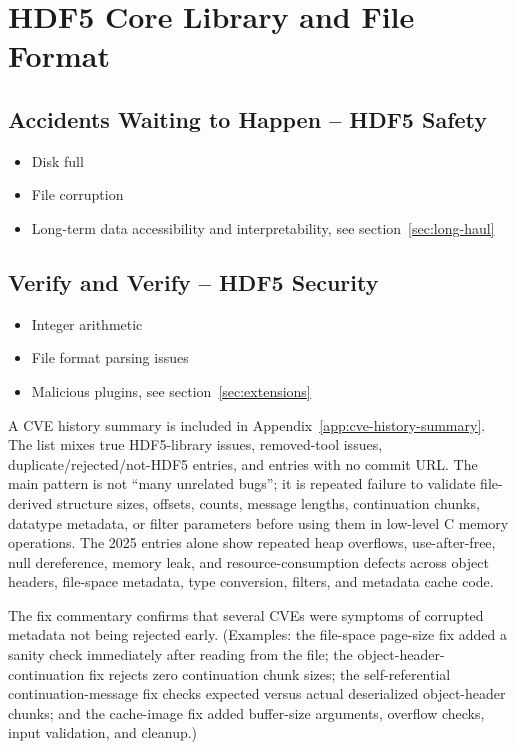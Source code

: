 \documentclass[../main.tex]{subfiles}
\begin{document}
\section{HDF5 Core Library and File Format}
\label{sec:core-lib-format}

\subsection{Accidents Waiting to Happen -- HDF5 Safety}

\begin{itemize}
    \item Disk full~\cite{forum-11714}
    \item File corruption~\cite{forum-file-corruption}
    \item Long-term data accessibility and interpretability, see section~\ref{sec:long-haul}
\end{itemize}

\subsection{Verify and Verify -- HDF5 Security}

\begin{itemize}
    \item Integer arithmetic
    \item File format parsing issues
    \item Malicious plugins, see section~\ref{sec:extensions}
\end{itemize}

A CVE history summary is included in Appendix~\ref{app:cve-history-summary}.
The list mixes true HDF5-library issues, removed-tool issues,
duplicate/rejected/not-HDF5 entries, and entries with no commit URL.
The main pattern is not “many unrelated bugs”; it is repeated failure to validate
file-derived structure sizes, offsets, counts, message lengths, continuation chunks,
datatype metadata, or filter parameters before using them in low-level C memory
operations. The 2025 entries alone show repeated heap overflows, use-after-free,
null dereference, memory leak, and resource-consumption defects across object
headers, file-space metadata, type conversion, filters, and metadata cache code.

The fix commentary confirms that several CVEs were symptoms of corrupted metadata
not being rejected early. (Examples: the file-space page-size fix added a sanity
check immediately after reading  from the file; the
object-header-continuation fix rejects zero continuation chunk sizes;
the self-referential continuation-message fix checks expected versus actual
deserialized object-header chunks; and the cache-image fix added buffer-size
arguments, overflow checks, input validation, and cleanup.)
\end{document}
